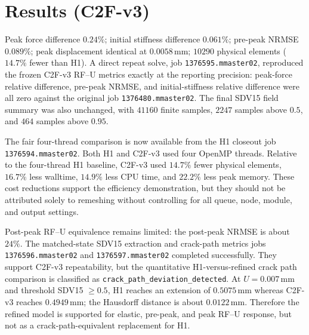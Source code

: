 \section{Results (C2F-v3)}
Peak force difference $0.24\%$; initial stiffness difference $0.061\%$;
pre-peak NRMSE $0.089\%$; peak displacement identical at $0.0058\,\mathrm{mm}$;
$10290$ physical elements ($14.7\%$ fewer than H1). A direct repeat solve,
job \texttt{1376595.mmaster02}, reproduced the frozen C2F-v3 RF--U metrics
exactly at the reporting precision: peak-force relative difference, pre-peak
NRMSE, and initial-stiffness relative difference were all zero against the
original job \texttt{1376480.mmaster02}. The final SDV15 field summary was also
unchanged, with $41160$ finite samples, $2247$ samples above $0.5$, and $464$
samples above $0.95$.

The fair four-thread comparison is now available from the H1 closeout job
\texttt{1376594.mmaster02}. Both H1 and C2F-v3 used four OpenMP threads. Relative
to the four-thread H1 baseline, C2F-v3 used $14.7\%$ fewer physical elements,
$16.7\%$ less walltime, $14.9\%$ less CPU time, and $22.2\%$ less peak memory.
These cost reductions support the efficiency demonstration, but they should not
be attributed solely to remeshing without controlling for all queue, node, module,
and output settings.

Post-peak RF--U equivalence remains limited: the post-peak NRMSE is about $24\%$.
The matched-state SDV15 extraction and crack-path metrics jobs
\texttt{1376596.mmaster02} and \texttt{1376597.mmaster02} completed successfully.
They support C2F-v3 repeatability, but the quantitative H1-versus-refined crack
path comparison is classified as \texttt{crack\_path\_deviation\_detected}. At
$U=0.007\,\mathrm{mm}$ and threshold SDV15 $\geq 0.5$, H1 reaches an extension of
$0.5075\,\mathrm{mm}$ whereas C2F-v3 reaches $0.4949\,\mathrm{mm}$; the Hausdorff
distance is about $0.0122\,\mathrm{mm}$. Therefore the refined model is supported
for elastic, pre-peak, and peak RF--U response, but not as a crack-path-equivalent
replacement for H1.

